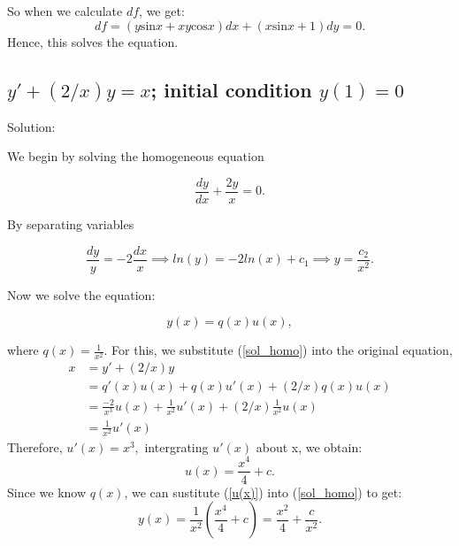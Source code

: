 \documentclass{article}
\begin{document}
		
		So when we calculate $df$, we get:
		\[ df = (y\text{sin}x + xy\text{cos}x)dx + (x\text{sin}x + 1)dy =0.\]
		Hence, this solves the equation.
		
\subsection{$y' + (2/x)y = x$; initial condition $y(1)=0$}

		Solution:

		We begin by solving the homogeneous equation

		\[ \frac{dy}{dx} + \frac{2y}{x} = 0.\]

		By separating variables  %

		\[\frac{dy}{y} = -2\frac{dx}{x} \implies ln(y) = -2ln(x) + c_1 \implies y = \frac{c_2}{x^2}.\]

		Now we solve the equation:

		\begin{equation} \label{sol_homo}
			y(x) = q(x)u(x),
		\end{equation}

		where $q(x) = \frac{1}{x^2}$. For this, we substitute (\ref{sol_homo}) into the original equation,
       \begin{equation*}
	         \begin{aligned}
	        	x&=y' + (2/x)y \\
	        	&=q'(x)u(x) +q(x)u'(x) + (2/x)q(x)u(x) \\
	        	&=\frac{-2}{x^3}	u(x) +\frac{1}{x^2}u'(x) + (2/x)\frac{1}{x^2}u(x)\\
	        	&=\frac{1}{x^2}u'(x)
	         \end{aligned}
       \end{equation*}
    Therefore, $u'(x) = x^3, $ intergrating $u'(x)$ about x, we obtain:
        \begin{equation}\label{u(x)}
        	u(x) = \frac{x^4}{4} + c .
        \end{equation} 
		Since we know $q(x)$, we can sustitute (\ref{u(x)}) into (\ref{sol_homo}) to get:
		\[y(x) = \frac{1}{x^2}\left(\frac{x^4}{4}+c\right) = \frac{x^2}{4} + \frac{c}{x^2}.\]
\end{document}
